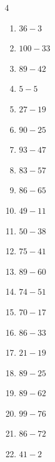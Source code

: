 \begin{multicols}{4}
\begin{enumerate}
  \item $36-3$
        \phantom{$=33$}

  \item $100-33$
        \phantom{$=67$}

  \item $89-42$
        \phantom{$=47$}

  \item $5-5$
        \phantom{$=0$}

  \item $27-19$
        \phantom{$=8$}

  \item $90-25$
        \phantom{$=65$}

  \item $93-47$
        \phantom{$=46$}

  \item $83-57$
        \phantom{$=26$}

  \item $86-65$
        \phantom{$=21$}

  \item $49-11$
        \phantom{$=38$}

  \item $50-38$
        \phantom{$=12$}

  \item $75-41$
        \phantom{$=34$}

  \item $89-60$
        \phantom{$=29$}

  \item $74-51$
        \phantom{$=23$}

  \item $70-17$
        \phantom{$=53$}

  \item $86-33$
        \phantom{$=53$}

  \item $21-19$
        \phantom{$=2$}

  \item $89-25$
        \phantom{$=64$}

  \item $89-62$
        \phantom{$=27$}

  \item $99-76$
        \phantom{$=23$}

  \item $86-72$
        \phantom{$=14$}

  \item $41-2$
        \phantom{$=39$}


\end{enumerate}
\end{multicols}
